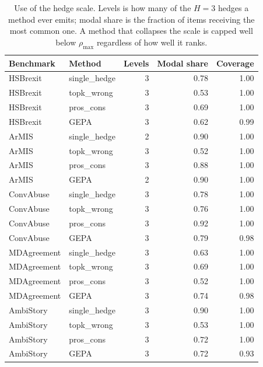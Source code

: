 \begin{table}[t]
\centering
\small
\begin{tabular}{llrrr}
\hline
Benchmark & Method & Levels & Modal share & Coverage \\
\hline
HSBrexit & single\_hedge & 3 & 0.78 & 1.00 \\
HSBrexit & topk\_wrong & 3 & 0.53 & 1.00 \\
HSBrexit & pros\_cons & 3 & 0.69 & 1.00 \\
HSBrexit & GEPA & 3 & 0.62 & 0.99 \\
ArMIS & single\_hedge & 2 & 0.90 & 1.00 \\
ArMIS & topk\_wrong & 3 & 0.52 & 1.00 \\
ArMIS & pros\_cons & 3 & 0.88 & 1.00 \\
ArMIS & GEPA & 2 & 0.90 & 1.00 \\
ConvAbuse & single\_hedge & 3 & 0.78 & 1.00 \\
ConvAbuse & topk\_wrong & 3 & 0.76 & 1.00 \\
ConvAbuse & pros\_cons & 3 & 0.92 & 1.00 \\
ConvAbuse & GEPA & 3 & 0.79 & 0.98 \\
MDAgreement & single\_hedge & 3 & 0.63 & 1.00 \\
MDAgreement & topk\_wrong & 3 & 0.69 & 1.00 \\
MDAgreement & pros\_cons & 3 & 0.52 & 1.00 \\
MDAgreement & GEPA & 3 & 0.74 & 0.98 \\
AmbiStory & single\_hedge & 3 & 0.90 & 1.00 \\
AmbiStory & topk\_wrong & 3 & 0.53 & 1.00 \\
AmbiStory & pros\_cons & 3 & 0.72 & 1.00 \\
AmbiStory & GEPA & 3 & 0.72 & 0.93 \\
\hline
\end{tabular}
\caption{Use of the hedge scale. Levels is how many of the $H=3$ hedges a method ever emits; modal share is the fraction of items receiving the most common one. A method that collapses the scale is capped well below $\rho_{\max}$ regardless of how well it ranks.}
\label{tab:stability}
\end{table}